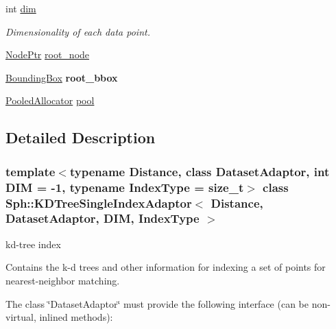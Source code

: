 \begin{DoxyCompactItemize}
\hypertarget{classSph_1_1KDTreeSingleIndexAdaptor_a251cff804024c3de6cc015ac7628b9d5}{}\label{classSph_1_1KDTreeSingleIndexAdaptor_a251cff804024c3de6cc015ac7628b9d5} 
int \hyperlink{classSph_1_1KDTreeSingleIndexAdaptor_a251cff804024c3de6cc015ac7628b9d5}{dim}
\begin{DoxyCompactList}\small\item\em Dimensionality of each data point. \end{DoxyCompactList}\item 
\hyperlink{structSph_1_1KDTreeSingleIndexAdaptor_1_1Node}{Node\+Ptr} \hyperlink{classSph_1_1KDTreeSingleIndexAdaptor_ad50d49993d446a1ab158fc75d55a7bd5}{root\+\_\+node}
\item 
\hypertarget{classSph_1_1KDTreeSingleIndexAdaptor_a423451ae505e1bb392be569b897c8660}{}\label{classSph_1_1KDTreeSingleIndexAdaptor_a423451ae505e1bb392be569b897c8660} 
\hyperlink{classSph_1_1KDTreeSingleIndexAdaptor_aaf4a44f184e81388817dbffb5771f186}{Bounding\+Box} {\bfseries root\+\_\+bbox}
\item 
\hyperlink{classSph_1_1PooledAllocator}{Pooled\+Allocator} \hyperlink{classSph_1_1KDTreeSingleIndexAdaptor_a0c3283516e497df16563c3e635ae4d29}{pool}
\end{DoxyCompactItemize}


\subsection{Detailed Description}
\subsubsection*{template$<$typename Distance, class Dataset\+Adaptor, int D\+IM = -\/1, typename Index\+Type = size\+\_\+t$>$\newline
class Sph\+::\+K\+D\+Tree\+Single\+Index\+Adaptor$<$ Distance, Dataset\+Adaptor, D\+I\+M, Index\+Type $>$}

kd-\/tree index

Contains the k-\/d trees and other information for indexing a set of points for nearest-\/neighbor matching.

The class \char`\"{}\+Dataset\+Adaptor\char`\"{} must provide the following interface (can be non-\/virtual, inlined methods)\+:


